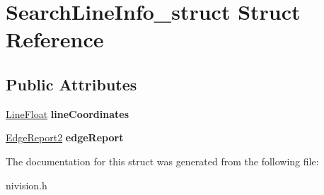 \hypertarget{structSearchLineInfo__struct}{
\section{SearchLineInfo\_\-struct Struct Reference}
\label{structSearchLineInfo__struct}
}
\subsection*{Public Attributes}
\begin{DoxyCompactItemize}
\item 
\hypertarget{structSearchLineInfo__struct_a02bcfb04529555056472f64f7ae74059}{
\hyperlink{structLineFloat__struct}{LineFloat} {\bfseries lineCoordinates}}
\label{structSearchLineInfo__struct_a02bcfb04529555056472f64f7ae74059}

\item 
\hypertarget{structSearchLineInfo__struct_a32f89487cd9d664c5a5676457bdf53c6}{
\hyperlink{structEdgeReport2__struct}{EdgeReport2} {\bfseries edgeReport}}
\label{structSearchLineInfo__struct_a32f89487cd9d664c5a5676457bdf53c6}

\end{DoxyCompactItemize}


The documentation for this struct was generated from the following file:\begin{DoxyCompactItemize}
\item 
nivision.h\end{DoxyCompactItemize}
